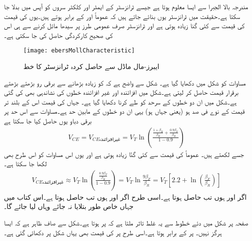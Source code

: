 مندرجہ بالا الجبرا سے ایسا معلوم ہوتا ہے جیسے ٹرانزسٹر کے ایمٹر اور کلکٹر  سروں کو آپس میں بدلا جا سکتا ہے۔حقیقت میں ٹرانزسٹر یوں بنائے جاتے ہیں کہ  عموماً   اور  کے برابر ہوتے ہیں۔یوں   کی قیمت  کی قیمت سے کئی گنا زیادہ ہوتی ہے اور ٹرانزسٹر صرف عمومی طرز پر سیدھا مائل کرنے سے ہی اس کی صحیح کارکردگی حاصل کی جا سکتی ہے۔
\begin{figure}
\centering
\texttt{[image: ebersMollCharacteristic]}
\caption{ایبرز-مال ماڈل سے حاصل کردہ ٹرانزسٹر کا خط}
\label{شکل_ایبر_مال_ماڈل_سے_حاصل_خط}
\end{figure}
مساوات   کو شکل   میں دکھایا گیا ہے۔ شکل سے واضح ہے کہ کو زیادہ بڑھانے سے برقی رو  بڑھتے بڑھتے برقرار قیمت   حاصل کر لیتی ہے۔شکل میں افزائندہ اور غیر افزائندہ خطوں کی نشاندہی بھی کی گئی ہے۔شکل میں ان دو خطوں کے سرحد کو طے کرنا دکھایا گیا ہے۔ جہاں  کی قیمت اس کے بلند تر قیمت کے نوے فی صد ہو (یعنی جہاں  ہو) یہی ان دو خطوں کے مابین حد ہے۔مساوات   سے اس حد پر برقی دباو  یوں حاصل کیا جا سکتا ہے
\begin{align}
V_{CE}=V_{CE\textrm{غیرافزائندہ}}=V_T \ln \left (\frac{\frac{1 + \beta_R}{\beta_R}+\frac{0.9 \beta_F}{\beta_R}}{1-0.9} \right )
\end{align}
جسے  لکھتے ہیں۔ عموماً   کی قیمت  سے کئی گنّا زیادہ ہوتی ہے اور یوں اس مساوات کو اس طرح بھی لکھا جا سکتا ہے۔
\begin{align}
V_{CE\textrm{غیرافزائندہ}} \approx V_T \ln  \left (\frac{\frac{0.9 \beta_F}{\beta_R}}{1-0.9} \right )=V_T \ln \frac{9 \beta_F}{\beta_R}= V_T \left [2.2+\ln \left(\frac{\beta_F}{\beta_R} \right ) \right ]
\end{align}
اگر   اور  ہوں تب { }حاصل ہوتا ہے۔اسی طرح اگر   اور  ہوں تب   حاصل ہوتا ہے۔اس کتاب میں جہاں خاص طور بتلایا نہ جائے وہاں  لیا جائے گا۔

صفحہ  پر  شکل  میں دئے خطوط سے یہ غلط تاثر ملتا ہے کہ  پر  ہوتا ہے۔شکل   سے صاف ظاہر ہے کہ ایسا ہرگز نہیں۔ پر  کے برابر ہوتا ہے۔اسی طرح  پر  کی قیمت بھی یہاں شکل پر دکھائی گئی ہے۔

